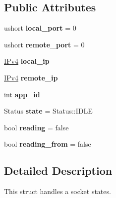 \subsection*{Public Attributes}
\begin{DoxyCompactItemize}
\item 
ushort {\bfseries local\+\_\+port} = 0\hypertarget{structudp_1_1Socket_a9e707b4535b96737511e71b3f5603568}{}\label{structudp_1_1Socket_a9e707b4535b96737511e71b3f5603568}

\item 
ushort {\bfseries remote\+\_\+port} = 0\hypertarget{structudp_1_1Socket_a1ee80e71898b38176c69f28d71dafc71}{}\label{structudp_1_1Socket_a1ee80e71898b38176c69f28d71dafc71}

\item 
\hyperlink{structIPv4}{I\+Pv4} {\bfseries local\+\_\+ip}\hypertarget{structudp_1_1Socket_a540d11e152b828544286156c0c7c5cf2}{}\label{structudp_1_1Socket_a540d11e152b828544286156c0c7c5cf2}

\item 
\hyperlink{structIPv4}{I\+Pv4} {\bfseries remote\+\_\+ip}\hypertarget{structudp_1_1Socket_afb4311751f2fe800085edc726f1c29f6}{}\label{structudp_1_1Socket_afb4311751f2fe800085edc726f1c29f6}

\item 
int {\bfseries app\+\_\+id}\hypertarget{structudp_1_1Socket_a381ca87c16323934dc91465c404062bb}{}\label{structudp_1_1Socket_a381ca87c16323934dc91465c404062bb}

\item 
Status {\bfseries state} = Status\+::\+I\+D\+LE\hypertarget{structudp_1_1Socket_a11a9fa6524bc2a95144d35d16c62e86b}{}\label{structudp_1_1Socket_a11a9fa6524bc2a95144d35d16c62e86b}

\item 
bool {\bfseries reading} = false\hypertarget{structudp_1_1Socket_a350bf97114515c291e254256933247e2}{}\label{structudp_1_1Socket_a350bf97114515c291e254256933247e2}

\item 
bool {\bfseries reading\+\_\+from} = false\hypertarget{structudp_1_1Socket_a925962404f3489233d3d17c16ec58dd4}{}\label{structudp_1_1Socket_a925962404f3489233d3d17c16ec58dd4}

\end{DoxyCompactItemize}


\subsection{Detailed Description}
This struct handles a socket states. 


